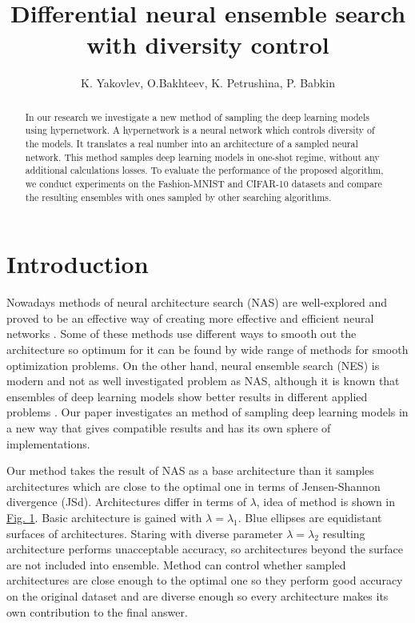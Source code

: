 \documentclass{article}
\title{Differential neural ensemble search with diversity control}
\author{K. Yakovlev, O.Bakhteev, K. Petrushina, P. Babkin
}
\date{}
\begin{document}
\maketitle

\begin{abstract}
	
In our research we investigate a new method of sampling the deep learning models using
hypernetwork. A hypernetwork is a neural network which controls diversity of the models. It translates a real number into an architecture of a sampled neural network. This method samples deep learning models in one-shot regime, without any additional calculations losses.
To evaluate the performance of the proposed algorithm, we conduct experiments on the Fashion-MNIST and CIFAR-10
datasets and compare the resulting ensembles with ones sampled by other searching algorithms.

\end{abstract}



\section{Introduction}

Nowadays methods of neural architecture search (NAS) are well-explored and proved to be an effective way of creating
more effective and efficient neural networks \citep{darts, robustify, xnas}. Some of these methods use different ways to smooth out the architecture so optimum for it can
be found by wide range of methods for smooth optimization problems. On the other hand, neural ensemble search (NES) is
modern and not as well investigated problem as NAS, although it is known that ensembles of deep learning models show better
results in different applied problems \citep{multi-head}.
Our paper investigates an method of sampling deep learning models in a new way that gives compatible results and has its own sphere
of implementations.

Our method takes the result of NAS as a base architecture than it samples architectures which are close to the optimal one in terms of Jensen-Shannon divergence (JSd). Architectures differ in terms of $\lambda$, idea of method is shown in \hyperref[fig:arch]{Fig. 1}. Basic architecture is gained with $\lambda = \lambda_1$.
Blue ellipses are equidistant surfaces of architectures. Staring with diverse parameter $\lambda = \lambda_2$ resulting architecture performs unacceptable accuracy, so architectures beyond the surface are not included into ensemble.
Method can control whether sampled architectures are close enough to the optimal one so they perform good accuracy on the original dataset and are diverse enough so every architecture makes its own contribution to the final answer.
\end{document}
